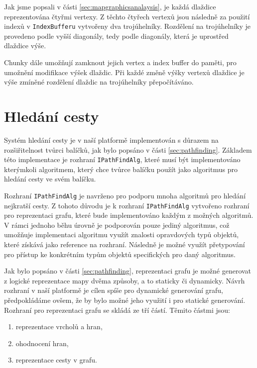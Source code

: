 Jak jsme popsali v části \ref{sec:mapgraphicsanalaysis}, je každá dlaždice reprezentována čtyřmi vertexy. Z těchto čtyřech vertexů jsou následně za použití indexů v \texttt{IndexBufferu} vytvořeny dva trojúhelníky. Rozdělení na trojúhelníky je provedeno podle vyšší diagonály, tedy podle diagonály, která je uprostřed dlaždice výše. 

Chunky dále umožňují zamknout jejich vertex a index buffer do paměti, pro umožnění modifikace výšek dlaždic. Při každé změně výšky vertexů dlaždice je výše zmíněné rozdělení dlaždic na trojúhelníky přepočítáváno.

\section{Hledání cesty}
\label{sec:pathfindingdocu}
Systém hledání cesty je v naší platformě implementován s důrazem na rozšiřitelnost tvůrci balíčků, jak bylo popsáno v části \ref{sec:pathfinding}. Základem této implementace je rozhraní \texttt{IPathFindAlg}, které musí být implementováno kterýmkoli algoritmem, který chce tvůrce balíčku použít jako algoritmus pro hledání cesty ve svém balíčku.

Rozhraní \texttt{IPathFindAlg} je navrženo pro podporu mnoha algoritmů pro hledání nejkratší cesty. Z tohoto důvodu je k rozhraní \texttt{IPathFindAlg} vytvořeno rozhraní pro reprezentaci grafu, které bude implementováno každým z možných algoritmů. V rámci jednoho běhu úrovně je podporován pouze jediný algoritmus, což umožňuje implementaci algoritmu využít znalosti opravdových typů objektů, které získává jako reference na rozhraní. Následně je možné využít přetypování pro přístup ke konkrétním typům objektů specifických pro daný algoritmus.

Jak bylo popsáno v části \ref{sec:pathfinding}, reprezentaci grafu je možné generovat z logické reprezentace mapy dvěma způsoby, a to staticky či dynamicky. Návrh rozhraní v naší platformě je cílen spíše pro dynamické generování grafu, předpokládáme ovšem, že by bylo možné jeho využití i pro statické generování. Rozhraní pro reprezentaci grafu se skládá ze tří částí. Těmito částmi jsou:

\begin{enumerate}
	\item reprezentace vrcholů a hran,
	\item ohodnocení hran,
	\item reprezentace cesty v grafu.
\end{enumerate}

